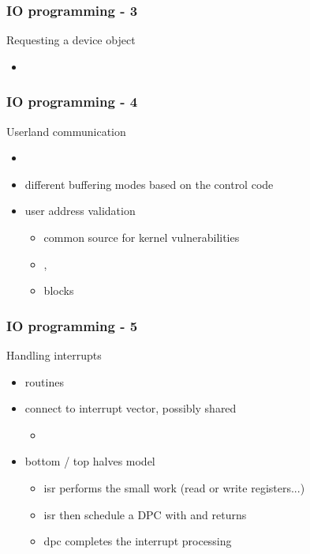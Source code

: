 
\begin{frame}
 \frametitle{IO programming - 3}

 Requesting a device object

 \begin{itemize}
  \item {}
 \end{itemize}

\end{frame}


\begin{frame}
 \frametitle{IO programming - 4}

 Userland communication

 \begin{itemize}
  \item {}
  \item different buffering modes based on the control code
  \item user address validation
  \begin{itemize}
   \item common source for kernel vulnerabilities
   \item {}, 
   \item {} blocks
  \end{itemize}
 \end{itemize}

\end{frame}


\begin{frame}
 \frametitle{IO programming - 5}

 Handling interrupts

 \begin{itemize}
  \item {} routines

  \item connect to interrupt vector, possibly shared
   \begin{itemize}
   \item {}
  \end{itemize}

  \item bottom / top halves model
  \begin{itemize}
   \item isr performs the small work (read or write registers...)
   \item isr then schedule a DPC with  and returns
   \item dpc completes the interrupt processing
  \end{itemize}

 \end{itemize}

\end{frame}

